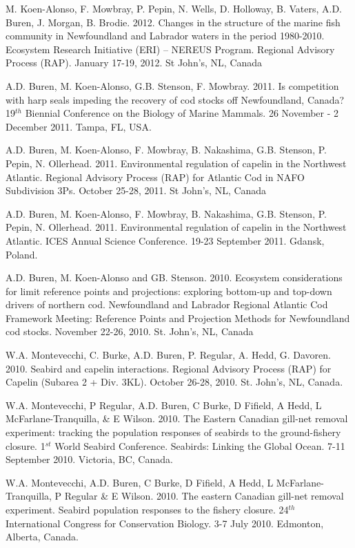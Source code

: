 \documentclass{res}
\begin{document}
\begin{resume}
\begin{hangparas}{.4in}{1}
M. Koen-Alonso, F. Mowbray, P. Pepin, N. Wells, D. Holloway, B. Vaters, A.D. Buren, J. Morgan, B. Brodie. 2012. Changes in the structure of the marine fish community in Newfoundland and Labrador waters in the period 1980-2010. Ecosystem Research Initiative (ERI) – NEREUS Program. Regional Advisory Process (RAP). January 17-19, 2012. St John's, NL, Canada

A.D. Buren, M. Koen-Alonso, G.B. Stenson, F. Mowbray. 2011. Is competition with harp seals impeding the recovery of cod stocks off Newfoundland, Canada? 19$^{th}$ Biennial Conference on the Biology of Marine Mammals. 26 November - 2 December 2011. Tampa, FL, USA.

A.D. Buren, M. Koen-Alonso, F. Mowbray, B. Nakashima, G.B. Stenson, P. Pepin, N. Ollerhead. 2011. Environmental regulation of capelin in the Northwest Atlantic. Regional Advisory Process (RAP) for Atlantic Cod in NAFO Subdivision 3Ps. October 25-28, 2011. St John's, NL, Canada

A.D. Buren, M. Koen-Alonso, F. Mowbray, B. Nakashima, G.B. Stenson, P. Pepin, N. Ollerhead. 2011. Environmental regulation of capelin in the Northwest Atlantic. ICES Annual Science Conference. 19-23 September 2011. Gdansk, Poland.

A.D. Buren, M. Koen-Alonso and GB. Stenson. 2010. Ecosystem considerations for limit reference points and projections: exploring bottom-up and top-down drivers of northern cod. Newfoundland and Labrador Regional Atlantic Cod Framework Meeting: Reference Points and Projection Methods for Newfoundland cod stocks. November 22-26, 2010. St. John’s, NL, Canada

W.A. Montevecchi, C. Burke, A.D. Buren, P. Regular, A. Hedd, G. Davoren. 2010. Seabird and capelin interactions. Regional Advisory Process (RAP) for Capelin (Subarea 2 + Div. 3KL). October 26-28, 2010. St. John’s, NL, Canada. 

W.A. Montevecchi, P Regular, A.D. Buren, C Burke, D Fifield, A Hedd, L McFarlane-Tranquilla, \& E Wilson. 2010. The Eastern Canadian gill-net removal experiment: tracking the population responses of seabirds to the ground-fishery closure. 1$^{st}$ World Seabird Conference. Seabirds: Linking the Global Ocean. 7-11 September 2010. Victoria, BC, Canada.

W.A. Montevecchi, A.D. Buren, C Burke, D Fifield, A Hedd, L McFarlane-Tranquilla, P Regular \& E Wilson. 2010. The eastern Canadian gill-net removal experiment. Seabird population responses to the fishery closure. 24$^{th}$ International Congress for Conservation Biology. 3-7 July 2010. Edmonton, Alberta, Canada.


\end{hangparas}
\end{resume}
\end{document}
